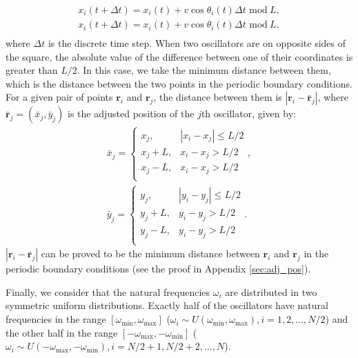 \documentclass[%
 aip,
 amsmath,amssymb,
 reprint,%
]{revtex4-1}
\begin{document}
\begin{equation}
    \begin{array}{c}
        x_i\left( t+\Delta t \right) =x_i\left( t \right) +v\cos \theta _i\left( t \right) \Delta t\,\,\mathrm{mod}\ L,\\
        x_i\left( t+\Delta t \right) =x_i\left( t \right) +v\cos \theta _i\left( t \right) \Delta t\,\,\mathrm{mod}\ L,\\
    \end{array}
\end{equation}
where $\Delta t$ is the discrete time step. When two oscillators are on opposite sides of the square, the absolute value of the difference between one of their coordinates is greater than $L/2$. In this case, we take the minimum distance between them, which is the distance between the two points in the periodic boundary conditions. For a given pair of points $\mathbf{r}_i$ and $\mathbf{r}_j$, the distance between them is $\left| \mathbf{r}_i-\bar{\mathbf{r}}_j \right|$, where $\bar{\mathbf{r}}_j=\left( \bar{x}_j,\bar{y}_j \right)$ is the adjusted position of the $j$th oscillator, given by:
\begin{eqnarray}
    \bar{x}_j=\begin{cases}
        x_j,&		\left| x_i-x_j \right|\le L/2\\
        x_j+L,&		x_i-x_j>L/2\\
        x_j-L,&		x_i-x_j>L/2\\
    \end{cases},
    \\
    \bar{y}_j=\begin{cases}
        y_j,&		\left| y_i-y_j \right|\le L/2\\
        y_j+L,&		y_i-y_j>L/2\\
        y_j-L,&		y_i-y_j>L/2\\
    \end{cases}.
\end{eqnarray}
$\left| \mathbf{r}_i-\bar{\mathbf{r}}_j \right|$ can be proved to be the minimum distance between $\mathbf{r}_i$ and $\mathbf{r}_j$ in the periodic boundary conditions (see the proof in Appendix \ref{sec:adj_pos}).

Finally, we consider that the natural frequencies $\omega_i$ are distributed in two symmetric uniform distributions. Exactly half of the oscillators have natural frequencies in the range $\left[ \omega _{\min},\omega _{\max} \right]$ ($\omega_i \sim U\left( \omega _{\min},\omega _{\max} \right), i=1,2,\ldots,N/2$) and the other half in the range $\left[ -\omega _{\max},-\omega _{\min} \right]$ ($\omega_i \sim U\left( -\omega _{\max},-\omega _{\min} \right), i=N/2+1,N/2+2,\ldots,N$).
\end{document}
